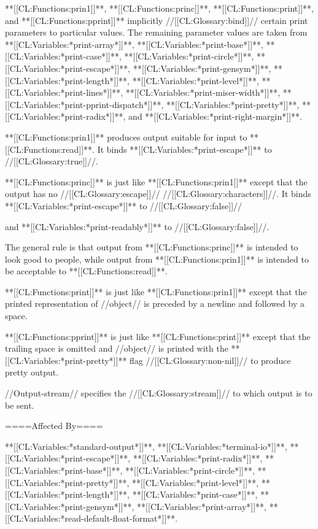 **[[CL:Functions:prin1]]**, **[[CL:Functions:princ]]**, **[[CL:Functions:print]]**, and **[[CL:Functions:pprint]]** implicitly //[[CL:Glossary:bind]]// certain print parameters to particular values. The remaining parameter values are taken from **[[CL:Variables:*print-array*]]**, **[[CL:Variables:*print-base*]]**, **[[CL:Variables:*print-case*]]**, **[[CL:Variables:*print-circle*]]**, **[[CL:Variables:*print-escape*]]**, **[[CL:Variables:*print-gensym*]]**, **[[CL:Variables:*print-length*]]**, **[[CL:Variables:*print-level*]]**, **[[CL:Variables:*print-lines*]]**, **[[CL:Variables:*print-miser-width*]]**, **[[CL:Variables:*print-pprint-dispatch*]]**, **[[CL:Variables:*print-pretty*]]**, **[[CL:Variables:*print-radix*]]**, and **[[CL:Variables:*print-right-margin*]]**.

**[[CL:Functions:prin1]]** produces output suitable for input to **[[CL:Functions:read]]**. It binds **[[CL:Variables:*print-escape*]]** to //[[CL:Glossary:true]]//.

**[[CL:Functions:princ]]** is just like **[[CL:Functions:prin1]]** except that the output has no //[[CL:Glossary:escape]]// //[[CL:Glossary:characters]]//. It binds **[[CL:Variables:*print-escape*]]** to //[[CL:Glossary:false]]//

and **[[CL:Variables:*print-readably*]]** to //[[CL:Glossary:false]]//.

The general rule is that output from **[[CL:Functions:princ]]** is intended to look good to people, while output from **[[CL:Functions:prin1]]** is intended to be acceptable to **[[CL:Functions:read]]**.

**[[CL:Functions:print]]** is just like **[[CL:Functions:prin1]]** except that the printed representation of //object// is preceded by a newline and followed by a space.

**[[CL:Functions:pprint]]** is just like **[[CL:Functions:print]]** except that the trailing space is omitted and //object// is printed with the **[[CL:Variables:*print-pretty*]]** flag //[[CL:Glossary:non-nil]]// to produce pretty output.

//Output-stream// specifies the //[[CL:Glossary:stream]]// to which output is to be sent.

====Affected By====

**[[CL:Variables:*standard-output*]]**, **[[CL:Variables:*terminal-io*]]**, **[[CL:Variables:*print-escape*]]**, **[[CL:Variables:*print-radix*]]**, **[[CL:Variables:*print-base*]]**, **[[CL:Variables:*print-circle*]]**, **[[CL:Variables:*print-pretty*]]**, **[[CL:Variables:*print-level*]]**, **[[CL:Variables:*print-length*]]**, **[[CL:Variables:*print-case*]]**, **[[CL:Variables:*print-gensym*]]**, **[[CL:Variables:*print-array*]]**, **[[CL:Variables:*read-default-float-format*]]**.

